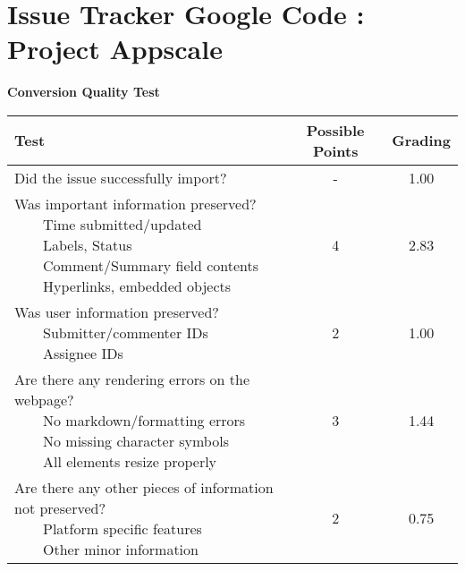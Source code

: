 \documentclass{article}
\newcommand{\tabitem}{~~\llap{\textbullet}~~}
\begin{document}
\\\section{Issue Tracker Google Code : Project Appscale}
\textbf{Conversion Quality Test}\\
\begin{adjustbox}{center}
	\renewcommand{\arraystretch}{1.5}
	\begin{tabular}{ p{6cm} | c | c }
		Test & Possible Points & Grading \\ \hline
		Did the issue successfully import? & - & 1.00 \\
		\hline
		\makecell[l]{
			Was important information preserved? \\
			\tabitem Time submitted/updated \\
			\tabitem Labels, Status \\
			\tabitem Comment/Summary field contents \\
			\tabitem Hyperlinks, embedded objects}
		& 4 & 2.83 \\
		\hline
		\makecell[l]{
			Was user information preserved? \\
			\tabitem Submitter/commenter IDs \\
			\tabitem Assignee IDs
		} & 2 & 1.00 \\
		\hline
		\makecell[{{p{6cm}}}]{
			Are there any rendering errors on the webpage? \\
			\tabitem No markdown/formatting errors \\
			\tabitem No missing character symbols \\
			\tabitem All elements resize properly
		} & 3 & 1.44 \\
		\hline
		\makecell[{{p{6cm}}}]{
			Are there any other pieces of information not preserved? \\
			\tabitem Platform specific features \\
			\tabitem Other minor information
		} & 2 & 0.75 \\
	\end{tabular}
\end{adjustbox}
\\
\end{document}
